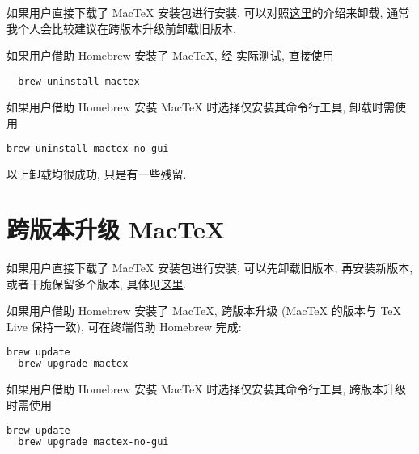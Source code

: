 如果用户直接下载了 Mac\TeX{} 安装包进行安装,
可以对照\href{https://www.tug.org/mactex/uninstalling.html}{这里}的介绍来卸载,
通常我个人会比较建议在跨版本升级前卸载旧版本.

如果用户借助 Homebrew 安装了 Mac\TeX,
经%
\href{https://github.com/OsbertWang/install-latex-guide-zh-cn/pull/39#discussion_r1368152254}{实际测试},
直接使用
\begin{lstlisting}
  brew uninstall mactex
\end{lstlisting}

如果用户借助 Homebrew 安装 Mac\TeX{} 时选择仅安装其命令行工具,
卸载时需使用
\begin{lstlisting}[language=bash]
  brew uninstall mactex-no-gui
\end{lstlisting}

以上卸载均很成功,
只是有一些残留.

\section{跨版本升级 Mac\TeX}

如果用户直接下载了 Mac\TeX{} 安装包进行安装,
可以先卸载旧版本,
再安装新版本,
或者干脆保留多个版本,
具体见\href{https://www.tug.org/mactex/multipletexdistributions.html}{这里}.

如果用户借助 Homebrew 安装了 Mac\TeX,
跨版本升级 (Mac\TeX{} 的版本与 \TeX{} Live 保持一致), 可在\textsf{终端}借助 Homebrew 完成:
\begin{lstlisting}[language=bash]
  brew update
  brew upgrade mactex
\end{lstlisting}

如果用户借助 Homebrew 安装 Mac\TeX{} 时选择仅安装其命令行工具,
跨版本升级时需使用
\begin{lstlisting}[language=bash]
  brew update
  brew upgrade mactex-no-gui
\end{lstlisting}
